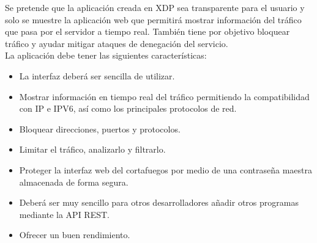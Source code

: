 Se pretende que la aplicación creada en XDP sea transparente para el usuario y solo se muestre la aplicación web que permitirá mostrar información del tráfico que pasa por el servidor a tiempo real. También tiene por objetivo bloquear tráfico y ayudar mitigar ataques de denegación del servicio.
\\La aplicación debe tener las siguientes características:
\begin{itemize}
        \item La interfaz deberá ser sencilla de utilizar.
        \item Mostrar información en tiempo real del tráfico permitiendo la compatibilidad con IP e IPV6, así como los principales protocolos de red.
        \item Bloquear direcciones, puertos y protocolos.
        \item Limitar el tráfico, analizarlo y filtrarlo.
        \item Proteger la interfaz web del cortafuegos por medio de una contraseña maestra almacenada de forma segura.
        \item Deberá ser muy sencillo para otros desarrolladores añadir otros programas mediante la API REST.
        \item Ofrecer un buen rendimiento.
\end{itemize}